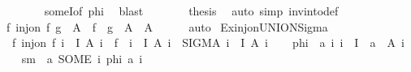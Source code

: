 \begin{isabellebody}
\ \ \ \ \ \ \isamarkupfalse%
\ someI{\isacharbrackleft}{\kern0pt}of\ {\isacharquery}{\kern0pt}phi{\isacharbrackright}{\kern0pt}\ \isamarkupfalse%
\ blast\isanewline
\ \ \ \ \isamarkupfalse%
\ \isamarkupfalse%
\ {\isacharquery}{\kern0pt}thesis\ \isamarkupfalse%
\ {\isacharparenleft}{\kern0pt}auto\ simp{\isacharcolon}{\kern0pt}\ inv{\isacharunderscore}{\kern0pt}into{\isacharunderscore}{\kern0pt}def{\isacharparenright}{\kern0pt}\isanewline
\ \ \isamarkupfalse%
\isanewline
\ \ \isamarkupfalse%
\ \isamarkupfalse%
\ {\isachardoublequoteopen}{\isasymexists}f{\isachardot}{\kern0pt}\ inj{\isacharunderscore}{\kern0pt}on\ f\ {\isacharparenleft}{\kern0pt}g\ {\isacharbackquote}{\kern0pt}\ A{\isacharprime}{\kern0pt}{\isacharparenright}{\kern0pt}\ {\isasymand}\ f\ {\isacharbackquote}{\kern0pt}\ g\ {\isacharbackquote}{\kern0pt}\ A{\isacharprime}{\kern0pt}\ {\isasymsubseteq}\ A{\isacharprime}{\kern0pt}{\isachardoublequoteclose}\isanewline
\ \ \ \ \isamarkupfalse%
\ auto\isanewline
{}\isamarkupfalse%
%
\endisatagproof
{\isafoldproof}%
%
\isadelimproof
\isanewline
%
\endisadelimproof
\isanewline
{}\isamarkupfalse%
\ Ex{\isacharunderscore}{\kern0pt}inj{\isacharunderscore}{\kern0pt}on{\isacharunderscore}{\kern0pt}UNION{\isacharunderscore}{\kern0pt}Sigma{\isacharcolon}{\kern0pt}\isanewline
\ \ {\isachardoublequoteopen}{\isasymexists}f{\isachardot}{\kern0pt}\ {\isacharparenleft}{\kern0pt}inj{\isacharunderscore}{\kern0pt}on\ f\ {\isacharparenleft}{\kern0pt}{\isasymUnion}i\ {\isasymin}\ I{\isachardot}{\kern0pt}\ A\ i{\isacharparenright}{\kern0pt}\ {\isasymand}\ f\ {\isacharbackquote}{\kern0pt}\ {\isacharparenleft}{\kern0pt}{\isasymUnion}i\ {\isasymin}\ I{\isachardot}{\kern0pt}\ A\ i{\isacharparenright}{\kern0pt}\ {\isasymsubseteq}\ {\isacharparenleft}{\kern0pt}SIGMA\ i\ {\isacharcolon}{\kern0pt}\ I{\isachardot}{\kern0pt}\ A\ i{\isacharparenright}{\kern0pt}{\isacharparenright}{\kern0pt}{\isachardoublequoteclose}\isanewline
%
\isadelimproof
%
\endisadelimproof
%
\isatagproof
{}\isamarkupfalse%
\isanewline
\ \ \isamarkupfalse%
\ {\isacharquery}{\kern0pt}phi\ {\isacharequal}{\kern0pt}\ {\isachardoublequoteopen}{\isasymlambda}a\ i{\isachardot}{\kern0pt}\ i\ {\isasymin}\ I\ {\isasymand}\ a\ {\isasymin}\ A\ i{\isachardoublequoteclose}\isanewline
\ \ \isamarkupfalse%
\ {\isacharquery}{\kern0pt}sm\ {\isacharequal}{\kern0pt}\ {\isachardoublequoteopen}{\isasymlambda}a{\isachardot}{\kern0pt}\ SOME\ i{\isachardot}{\kern0pt}\ {\isacharquery}{\kern0pt}phi\ a\ i{\isachardoublequoteclose}\isanewline

\end{isabellebody}
